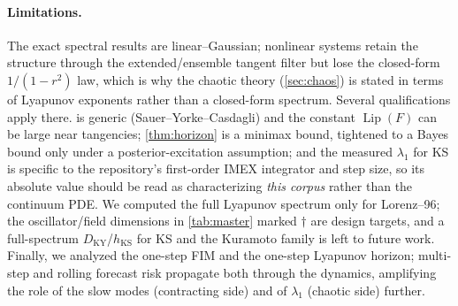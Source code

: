 \documentclass[10pt]{article}
\theoremstyle{plain}
\theoremstyle{definition}
\theoremstyle{remark}
\newcommand{\hKS}{h_{\mathrm{KS}}}
\newcommand{\DKY}{D_{\mathrm{KY}}}
\DeclareMathOperator{\Lip}{Lip}
\begin{document}
\paragraph{Limitations.}
The exact spectral results are linear--Gaussian; nonlinear systems retain the
structure through the extended/ensemble tangent filter but lose the closed-form
$1/(1-r^2)$ law, which is why the chaotic theory (\cref{sec:chaos}) is stated in
terms of Lyapunov exponents rather than a closed-form spectrum. Several
qualifications apply there.  is generic (Sauer--Yorke--Casdagli)
and the constant $\Lip(F)$ can be large near tangencies; \cref{thm:horizon} is a
minimax bound, tightened to a Bayes bound only under a posterior-excitation
assumption; and the measured $\lambda_1$ for KS is specific to the repository's
first-order IMEX integrator and step size, so its absolute value should be read as
characterizing \emph{this corpus} rather than the continuum PDE. We computed the
full Lyapunov spectrum only for Lorenz--96; the oscillator/field dimensions in
\cref{tab:master} marked $\dagger$ are design targets, and a full-spectrum
$\DKY$/$\hKS$ for KS and the Kuramoto family is left to future work. Finally, we
analyzed the one-step FIM and the one-step Lyapunov horizon; multi-step and
rolling forecast risk propagate both through the dynamics, amplifying the role of
the slow modes (contracting side) and of $\lambda_1$ (chaotic side) further.
\end{document}

